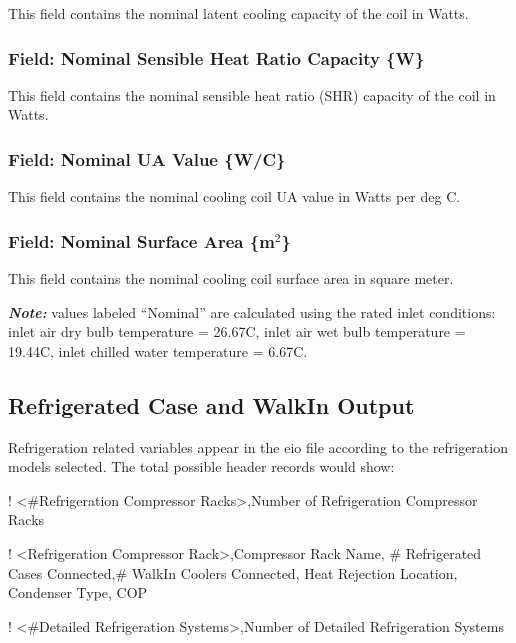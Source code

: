 This field contains the nominal latent cooling capacity of the coil in Watts.

\subsubsection{Field: Nominal Sensible Heat Ratio Capacity \{W\}}\label{field-nominal-sensible-heat-ratio-capacity-w}

This field contains the nominal sensible heat ratio (SHR) capacity of the coil in Watts.

\subsubsection{Field: Nominal UA Value \{W/C\}}\label{field-nominal-ua-value-wc}

This field contains the nominal cooling coil UA value in Watts per deg C.

\subsubsection{Field: Nominal Surface Area \{m\(^{2}\)\}}\label{field-nominal-surface-area-m2}

This field contains the nominal cooling coil surface area in square meter.

\textbf{\emph{Note:}} values labeled ``Nominal'' are calculated using the rated inlet conditions: inlet air dry bulb temperature = 26.67C, inlet air wet bulb temperature = 19.44C, inlet chilled water temperature = 6.67C.

\subsection{Refrigerated Case and WalkIn Output}\label{refrigerated-case-and-walkin-output}

Refrigeration related variables appear in the eio file according to the refrigeration models selected. The total possible header records would show:

! \textless{}\#Refrigeration Compressor Racks\textgreater{},Number of Refrigeration Compressor Racks

! \textless{}Refrigeration Compressor Rack\textgreater{},Compressor Rack Name, \# Refrigerated Cases Connected,\# WalkIn Coolers Connected, Heat Rejection Location, Condenser Type, COP

! \textless{}\#Detailed Refrigeration Systems\textgreater{},Number of Detailed Refrigeration Systems

